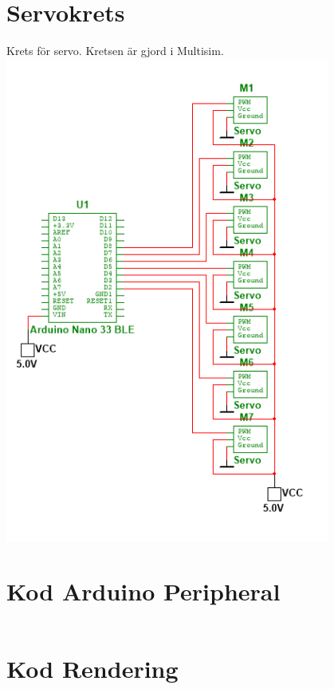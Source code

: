 \documentclass[a4paper]{article}
\begin{document}
\begin{sloppypar}
    \newpage
    \section{Servokrets}
    \label{bilaga:Kretsschema-servo}
    Krets för servo. Kretsen är gjord i Multisim.
    \includegraphics[width = 0.8\textwidth]{servo.png}

    \newpage
    \section{Kod Arduino Peripheral}
    \label{bilaga:Kod_Arduino_Peripheral}
    \inputminted[breaklines]{cpp}{./Code/peripheral.cpp}

    \newpage
    \section{Kod Rendering}
    \label{bilaga:Kod_Rendering}
    \inputminted[breaklines]{csharp}{./Code/handController.cs}
    \newpage
\end{sloppypar}
\end{document}
